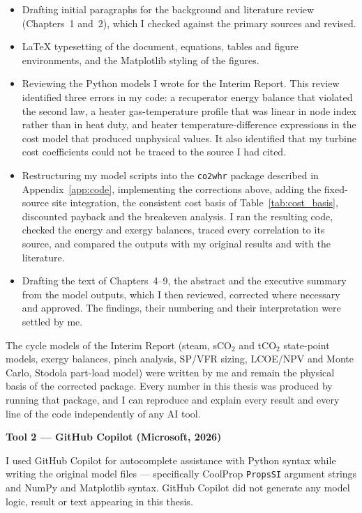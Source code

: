 \documentclass[12pt,a4paper]{report}
\begin{document}
\begin{itemize}[noitemsep,topsep=3pt]
  \item Drafting initial paragraphs for the background and literature review
    (Chapters~1 and~2), which I checked against the primary sources and
    revised.
  \item \LaTeX{} typesetting of the document, equations, tables and figure
    environments, and the Matplotlib styling of the figures.
  \item Reviewing the Python models I wrote for the Interim Report. This
    review identified three errors in my code: a recuperator energy balance
    that violated the second law, a heater gas-temperature profile that was
    linear in node index rather than in heat duty, and heater
    temperature-difference expressions in the cost model that produced
    unphysical values. It also identified that my turbine cost coefficients
    could not be traced to the source I had cited.
  \item Restructuring my model scripts into the \texttt{co2whr} package
    described in Appendix~\ref{app:code}, implementing the corrections above,
    adding the fixed-source site integration, the consistent cost basis of
    Table~\ref{tab:cost_basis}, discounted payback and the breakeven analysis.
    I ran the resulting code, checked the energy and exergy balances, traced
    every correlation to its source, and compared the outputs with my
    original results and with the literature.
  \item Drafting the text of Chapters~4--9, the abstract and the executive
    summary from the model outputs, which I then reviewed, corrected where
    necessary and approved. The findings, their numbering and their
    interpretation were settled by me.
\end{itemize}

\noindent The cycle models of the Interim Report (steam, sCO$_2$ and tCO$_2$
state-point models, exergy balances, pinch analysis, SP/VFR sizing, LCOE/NPV
and Monte Carlo, Stodola part-load model) were written by me and remain the
physical basis of the corrected package. Every number in this thesis was
produced by running that package, and I can reproduce and explain every
result and every line of the code independently of any AI tool.

\bigskip
\noindent\textbf{Tool 2 --- GitHub Copilot (Microsoft, 2026)~\cite{GitHubCopilot2026}}

\noindent I used GitHub Copilot for autocomplete assistance with Python
syntax while writing the original model files --- specifically CoolProp
\texttt{PropsSI} argument strings and NumPy and Matplotlib syntax. GitHub
Copilot did not generate any model logic, result or text appearing in this
thesis.
\end{document}
